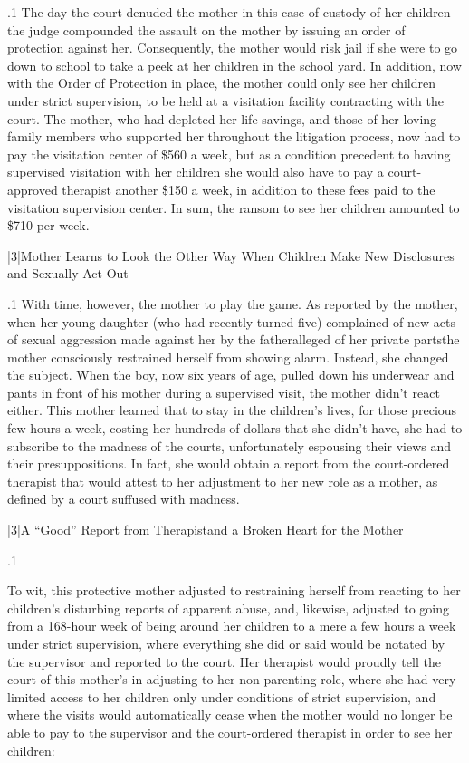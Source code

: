 \documentclass[11pt, twoside]{article}
\begin{document}
{\p.1{%
\noindent{}The day the court denuded the mother in this case of custody of her
children the judge compounded the assault on the mother by issuing
an order of protection against her. Consequently, the mother would
risk jail if she were to go down to school to take a peek at her children
in the school yard. In addition, now with the Order of Protection in
place, the mother could only see her children under strict supervision,
to be held at a visitation facility contracting with the court. The mother,
who had depleted her life savings, and those of her loving family members who supported her throughout the litigation process, now had to
pay the visitation center  of \$560 a week, but as a
condition precedent to having supervised visitation with her
children she would also have to pay a court-approved therapist another \$150 a
week, in addition to these fees paid to the visitation supervision
center. In sum, the ransom to see her children amounted to \$710 per
week.
}%


\s|3|{Mother Learns to Look the Other Way When Children Make New Disclosures and Sexually Act Out}

\p.1{%
\noindent{}With time, however, the mother  to play the game. As reported
by the mother, when her young daughter (who had recently turned five)
complained of new acts of sexual aggression made against her by the
father\mdash{}alleged  of her private parts\mdash{}the mother consciously
restrained herself from showing alarm. Instead, she changed the subject. When the boy, now six years of age, pulled down his underwear
and pants in front of his mother during a supervised visit, the mother
didn’t react either. This mother learned that to stay in the children’s lives,
for those precious few hours a week, costing her hundreds of dollars that
she didn’t have, she had to subscribe to the madness of the courts, unfortunately espousing their views and their presuppositions. In fact, she
would obtain a  report from the court-ordered therapist that
would attest to her adjustment to her new role as a mother, as defined
by a court suffused with madness.
}%


\s|3|{A ``Good'' Report from Therapist\mdash{}and a Broken Heart for the Mother}

\p.1{%
\noindent{}To wit, this protective mother adjusted to restraining herself from reacting to her children’s disturbing reports of apparent abuse, and, likewise,
adjusted to going from a 168-hour week of being around her children to
a mere a few hours a week under strict supervision, where everything she
did or said would be notated by the supervisor and reported to the court.
Her therapist would proudly tell the court of this mother’s  in
adjusting to her non-parenting role, where she had very limited access to
her children only under conditions of strict supervision, and where the
visits would automatically cease when the mother would no longer be able to
pay  to the supervisor and the court-ordered therapist in order
to see her children:

}}
\end{document}
